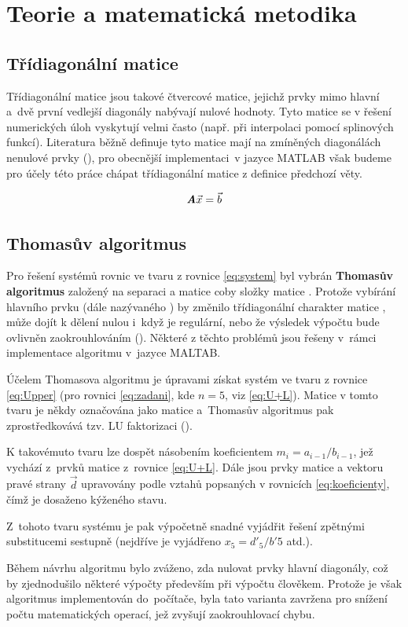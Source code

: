 \documentclass[12pt]{CLASS/protokol}
\begin{document}
\section{Teorie a matematická metodika}\label{sec:teorie}
    \subsection{Třídiagonální matice}
        Třídiagonální matice jsou takové čtvercové matice, jejichž prvky mimo hlavní a~dvě první vedlejší diagonály nabývají nulové hodnoty. Tyto matice se v řešení numerických úloh vyskytují velmi často (např. při interpolaci pomocí splinových funkcí). Literatura běžně definuje tyto matice mají na zmíněných diagonálách nenulové prvky (\cite{Mika1985}), pro obecnější implementaci~v jazyce MATLAB však budeme pro účely této práce chápat třídiagonální matice z definice předchozí věty.

        \begin{equation}\label{eq:system}
            \textbf{\textit{A}}\vec{x} = \vec{b}
        \end{equation}

    \subsection{Thomasův algoritmus}
        Pro řešení systémů rovnic ve tvaru z rovnice \ref{eq:system} byl vybrán \textbf{Thomasův algoritmus} založený na separaci  a  matice coby složky matice . Protože vybírání hlavního prvku (dále nazývaného ) by změnilo třídiagonální charakter matice , může dojít k dělení nulou i~když je  regulární, nebo že výsledek výpočtu bude ovlivněn zaokrouhlováním (\cite{Rektorys1995}). Některé z těchto problémů jsou řešeny v~rámci implementace algoritmu v~jazyce MALTAB.
        \par
        Účelem Thomasova algoritmu je úpravami získat systém ve tvaru z rovnice \ref{eq:Upper} (pro rovnici \ref{eq:zadani}, kde $n=5$, viz \ref{eq:U+L}). Matice v tomto tvaru je někdy označována jako matice  a~Thomasův algoritmus pak zprostředkovává tzv. LU faktorizaci (\cite{Rektorys1995}).
        \par
        K takovémuto tvaru lze dospět násobením koeficientem $m_i = a_{i-1} / b_{i-1}$, jež vychází z~prvků matice z~rovnice \ref{eq:U+L}. Dále jsou prvky matice a vektoru pravé strany $\vec{d}$ upravovány podle vztahů popsaných v rovnicích \ref{eq:koeficienty}, čímž je dosaženo kýženého stavu.
        \par
        Z~tohoto tvaru systému je pak výpočetně snadné vyjádřit řešení zpětnými substitucemi sestupně (nejdříve je vyjádřeno $x_5 = d'_5/b'5$ atd.).
        \par
        Během návrhu algoritmu bylo zváženo, zda nulovat prvky hlavní diagonály, což by zjednodušilo některé výpočty především při výpočtu člověkem. Protože je však algoritmus implementován do~počítače, byla tato varianta zavržena pro snížení počtu matematických operací, jež zvyšují zaokrouhlovací chybu.
\end{document}
